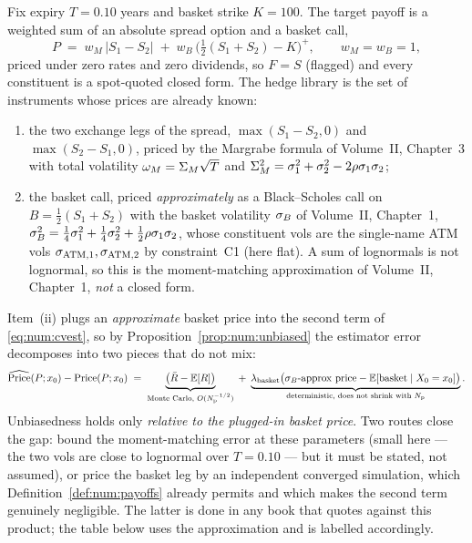 \begin{example}\label{ex:num:generic}
Fix expiry $T = 0.10$ years and basket strike $K = 100$. The target payoff is a
weighted sum of an absolute spread option and a basket call,
\[
   P \;=\; w_M\,\bigl|S_1 - S_2\bigr| \;+\; w_B\,\bigl(\tfrac12(S_1+S_2) - K\bigr)^+,
   \qquad w_M = w_B = 1,
\]
priced under zero rates and zero dividends, so $F = S$ (flagged) and every
constituent is a spot-quoted closed form. The hedge library is the set of
instruments whose prices are already known:
\begin{enumerate}[label=(\roman*)]
  \item the two exchange legs of the spread, $\max(S_1-S_2,0)$ and
        $\max(S_2-S_1,0)$, priced by the Margrabe formula of Volume~II,
        Chapter~3 with total volatility $\omega_M = \Sigma_M\sqrt{T}$ and
        $\Sigma_M^2 = \sigma_1^2 + \sigma_2^2 - 2\rho\sigma_1\sigma_2$;
  \item the basket call, priced \emph{approximately} as a Black--Scholes call on
        $B = \tfrac12(S_1+S_2)$ with the basket volatility $\sigma_B$ of Volume~II,
        Chapter~1, $\sigma_B^2 = \tfrac14\sigma_1^2 + \tfrac14\sigma_2^2
        + \tfrac12\rho\sigma_1\sigma_2$, whose constituent vols are the
        single-name ATM vols $\sigma_{\mathrm{ATM},1},\sigma_{\mathrm{ATM},2}$ by constraint~C1 (here flat).
        A sum of lognormals is not lognormal, so this is the moment-matching
        approximation of Volume~II, Chapter~1, \emph{not} a closed form.
\end{enumerate}
\end{example}

\begin{remark}\label{rem:num:pricebias}
Item~(ii) plugs an \emph{approximate} basket price into the second term of
\eqref{eq:num:cvest}, so by Proposition~\ref{prop:num:unbiased} the estimator
error decomposes into two pieces that do not mix:
\[
   \widehat{\mathrm{Price}}(P;x_0) - \mathrm{Price}(P;x_0)
   \;=\;
   \underbrace{\bigl(\bar R - \mathbb{E}[R]\bigr)}_{\text{Monte Carlo, } O(N_{\mathrm{p}}^{-1/2})}
   \;+\;
   \underbrace{\lambda_{\mathrm{basket}}\bigl(\sigma_B\text{-approx price} - \mathbb{E}[\text{basket}\mid X_0=x_0]\bigr)}_{\text{deterministic, does not shrink with } N_{\mathrm{p}}}.
\]
Unbiasedness holds only \emph{relative to the plugged-in basket price}. Two
routes close the gap: bound the moment-matching error at these parameters
(small here --- the two vols are close to lognormal over $T=0.10$ --- but it must
be stated, not assumed), or price the basket leg by an independent converged
simulation, which Definition~\ref{def:num:payoffs} already permits and which
makes the second term genuinely negligible. The latter is done in any book that
quotes against this product; the table below uses the approximation and is
labelled accordingly.
\end{remark}

